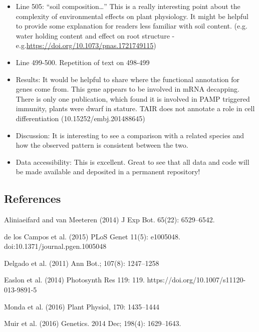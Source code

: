 \documentclass[10pt]{article}
\providecommand{\tightlist}{\setlength{\itemsep}{0pt}\setlength{\parskip}{0pt}}%
\begin{document}
\begin{itemize}
\tightlist
\item
  Line 505: ``soil composition\ldots{}'' This is a really interesting
  point about the complexity of environmental effects on plant
  physiology. It might be helpful to provide some explanation for
  readers less familiar with soil content. (e.g. water holding content
  and effect on root structure -
  e.g.\url{https://doi.org/10.1073/pnas.1721749115})
\item
  Line 499-500. Repetition of text on 498-499
\item
  Results: It would be helpful to share where the functional annotation
  for genes come from. This gene appears to be involved in mRNA
  decapping. There is only one publication, which found it is involved
  in PAMP triggered immunity, plants were dwarf in stature. TAIR does
  not annotate a role in cell differentiation (10.15252/embj.201488645)
\item
  Discussion: It is interesting to see a comparison with a related
  species and how the observed pattern is consistent between the two.
\end{itemize}

\begin{itemize}
\tightlist
\item
  Data accessibility: This is excellent. Great to see that all data and
  code will be made available and deposited in a permanent repository!
\end{itemize}

\subsection*{References}

{\label{424989}}

Aliniaeifard and van Meeteren (2014) J Exp Bot. 65(22): 6529--6542.

de los Campos et al. (2015) PLoS Genet 11(5): e1005048.
doi:10.1371/journal.pgen.1005048

Delgado et al. (2011) Ann Bot.; 107(8): 1247--1258

Easlon et al. (2014) Photosynth Res 119: 119.
https://doi.org/10.1007/s11120-013-9891-5

Monda et al. (2016) Plant Physiol, 170: 1435--1444

Muir et al. (2016) Genetics. 2014 Dec; 198(4): 1629--1643.

\textbf{}

\textbf{}

\textbf{}

\FloatBarrier
\end{document}
